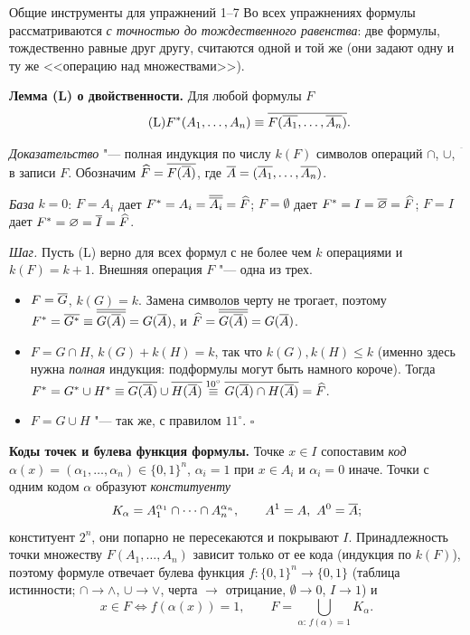 
\begin{remarkbox}{Общие инструменты для упражнений 1--7}
Во всех упражнениях формулы рассматриваются \emph{с точностью до
тождественного равенства}: две формулы, тождественно равные друг другу,
считаются одной и той же (они задают одну и ту же <<операцию над
множествами>>).

\textbf{Лемма (L) о двойственности.} Для любой формулы $F$
\begin{equation*}\tag{L}
F^*(A_1,\dots,A_n)\equiv\overline{F(\overline{A_1},\dots,\overline{A_n})}.
\end{equation*}

\emph{Доказательство} "--- полная индукция по числу $k(F)$ символов
операций $\cap$, $\cup$, ${}^{\overline{\phantom a}}$ в записи $F$.
Обозначим $\widehat F=\overline{F(\overline{A})}$, где $\overline{A}=(\overline{A_1},\dots,\overline{A_n})$.

\emph{База} $k=0$: $F=A_i$ дает $F^*=A_i=\overline{\overline{A_i}}=\widehat F$;
$F=\emptyset$ дает $F^*=I=\overline{\varnothing}=\widehat F$; $F=I$ дает
$F^*=\varnothing=\overline{I}=\widehat F$.

\emph{Шаг.} Пусть (L) верно для всех формул с не более чем $k$ операциями
и $k(F)=k+1$. Внешняя операция $F$ "--- одна из трех.
\begin{itemize}[nosep]
\item $F=\overline{G}$, $k(G)=k$. Замена символов черту не трогает, поэтому
  $F^*=\overline{G^*}\equiv\overline{\overline{G(\overline{A})}}=G(\overline{A})$, и
  $\widehat F=\overline{\overline{G(\overline{A})}}=G(\overline{A})$.
\item $F=G\cap H$, $k(G)+k(H)=k$, так что $k(G),k(H)\le k$ (именно здесь
  нужна \emph{полная} индукция: подформулы могут быть намного короче).
  Тогда $F^*=G^*\cup H^*\equiv\overline{G(\overline{A})}\cup\overline{H(\overline{A})}
  \overset{10^\circ}{\equiv}\overline{G(\overline{A})\cap H(\overline{A})}=\widehat F$.
\item $F=G\cup H$ "--- так же, с правилом $11^\circ$. \qquad$\square$
\end{itemize}

\textbf{Коды точек и булева функция формулы.} Точке $x\in I$ сопоставим
\emph{код} $\alpha(x)=(\alpha_1,\dots,\alpha_n)\in\{0,1\}^n$, $\alpha_i=1$
при $x\in A_i$ и $\alpha_i=0$ иначе. Точки с одним кодом $\alpha$ образуют
\emph{конституенту}
\[
K_\alpha=A_1^{\alpha_1}\cap\dots\cap A_n^{\alpha_n},\qquad A^1=A,\ A^0=\overline{A} ;
\]
конституент $2^n$, они попарно не пересекаются и покрывают $I$.
Принадлежность точки множеству $F(A_1,\dots,A_n)$ зависит только от ее
кода (индукция по $k(F)$), поэтому формуле отвечает булева функция
$f\colon\{0,1\}^n\to\{0,1\}$ (таблица истинности; $\cap\to\wedge$,
$\cup\to\vee$, черта $\to$ отрицание, $\emptyset\to0$, $I\to1$) и
\begin{equation*}\tag{D}
x\in F\iff f(\alpha(x))=1,\qquad F=\bigcup_{\alpha:\,f(\alpha)=1}K_\alpha .
\end{equation*}


\end{remarkbox}
